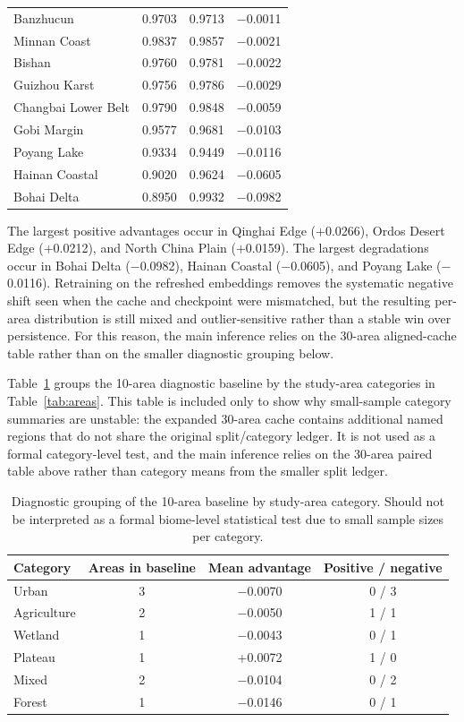 \documentclass{article}
\begin{document}
\begin{table}[htbp]
\begin{tabular}{lccc}
Banzhucun & 0.9703 & 0.9713 & $-$0.0011 \\
Minnan Coast & 0.9837 & 0.9857 & $-$0.0021 \\
Bishan & 0.9760 & 0.9781 & $-$0.0022 \\
Guizhou Karst & 0.9756 & 0.9786 & $-$0.0029 \\
Changbai Lower Belt & 0.9790 & 0.9848 & $-$0.0059 \\
Gobi Margin & 0.9577 & 0.9681 & $-$0.0103 \\
Poyang Lake & 0.9334 & 0.9449 & $-$0.0116 \\
Hainan Coastal & 0.9020 & 0.9624 & $-$0.0605 \\
Bohai Delta & 0.8950 & 0.9932 & $-$0.0982 \\
\bottomrule
\end{tabular}
\end{table}

The largest positive advantages occur in Qinghai Edge (+0.0266), Ordos Desert Edge (+0.0212), and North China Plain (+0.0159). The largest degradations occur in Bohai Delta ($-$0.0982), Hainan Coastal ($-$0.0605), and Poyang Lake ($-$0.0116). Retraining on the refreshed embeddings removes the systematic negative shift seen when the cache and checkpoint were mismatched, but the resulting per-area distribution is still mixed and outlier-sensitive rather than a stable win over persistence. For this reason, the main inference relies on the 30-area aligned-cache table rather than on the smaller diagnostic grouping below.


Table~\ref{tab:category_diagnostic} groups the 10-area diagnostic baseline by the study-area categories in Table~\ref{tab:areas}. This table is included only to show why small-sample category summaries are unstable: the expanded 30-area cache contains additional named regions that do not share the original split/category ledger. It is not used as a formal category-level test, and the main inference relies on the 30-area paired table above rather than category means from the smaller split ledger.

\begin{table}[htbp]
\centering
\caption{Diagnostic grouping of the 10-area baseline by study-area category. Should not be interpreted as a formal biome-level statistical test due to small sample sizes per category.}
\label{tab:category_diagnostic}
\small
\begin{tabular}{lccc}
\toprule
Category & Areas in baseline & Mean advantage & Positive / negative \\
\midrule
Urban & 3 & $-$0.0070 & 0 / 3 \\
Agriculture & 2 & $-$0.0050 & 1 / 1 \\
Wetland & 1 & $-$0.0043 & 0 / 1 \\
Plateau & 1 & +0.0072 & 1 / 0 \\
Mixed & 2 & $-$0.0104 & 0 / 2 \\
Forest & 1 & $-$0.0146 & 0 / 1 \\
\bottomrule
\end{tabular}
\end{table}
\end{document}
